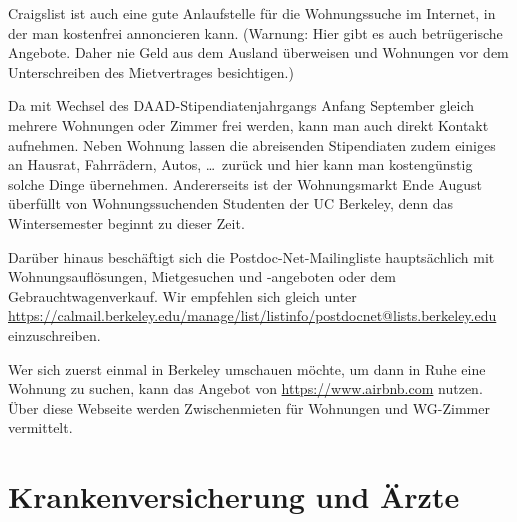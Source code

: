\documentclass[a4paper]{scrreprt}
\begin{document}
Craigslist ist auch eine gute Anlaufstelle für die Wohnungssuche im
Internet, in der man kostenfrei annoncieren kann. (Warnung: Hier gibt
es auch betrügerische Angebote. Daher nie Geld aus dem Ausland
überweisen und Wohnungen vor dem Unterschreiben des Mietvertrages
besichtigen.)

Da mit Wechsel des DAAD-Stipendiatenjahrgangs Anfang September gleich
mehrere Wohnungen oder Zimmer frei werden, kann man auch direkt
Kontakt aufnehmen. Neben Wohnung lassen die abreisenden Stipendiaten
zudem einiges an Hausrat, Fahrrädern, Autos, \dots\ zurück und hier kann
man kostengünstig solche Dinge übernehmen. Andererseits ist der Wohnungsmarkt Ende August \"uberf\"ullt von Wohnungssuchenden Studenten der UC Berkeley, denn das Wintersemester beginnt zu dieser Zeit.

Darüber hinaus beschäftigt sich die Postdoc-Net-Mailingliste
hauptsächlich mit Wohnungsauflösungen, Mietgesuchen und -angeboten
oder dem Gebrauchtwagenverkauf. Wir empfehlen sich gleich unter
\url{https://calmail.berkeley.edu/manage/list/listinfo/postdocnet@lists.berkeley.edu}
einzuschreiben.

Wer sich zuerst einmal in Berkeley umschauen möchte, um dann in Ruhe
eine Wohnung zu suchen, kann das Angebot von
\url{https://www.airbnb.com} nutzen. Über diese Webseite werden 
Zwischenmieten für Wohnungen und WG-Zimmer vermittelt. 

\section{Krankenversicherung und Ärzte}
\end{document}
